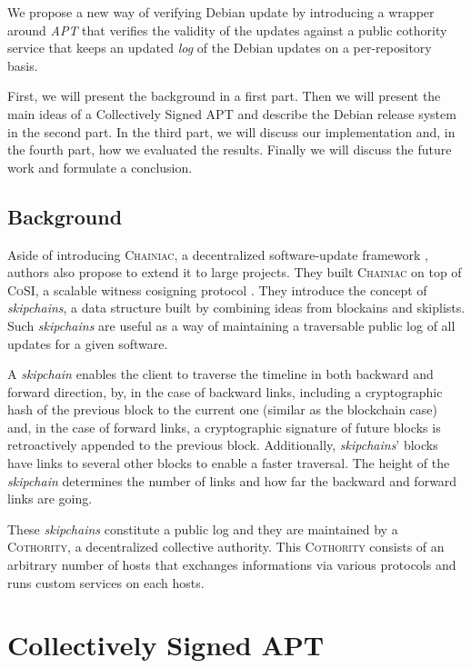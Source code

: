 \documentclass[11pt, upma4paper, twoside, openany, parskip=half]{book}
\begin{document}
We propose a new way of verifying Debian update by introducing a wrapper around \emph{APT} that verifies the validity of the updates against a public cothority service that keeps an updated \emph{log} of the Debian updates on a per-repository basis.

First, we will present the background in a first part. Then we will present the main ideas of a Collectively Signed APT and describe the Debian release system in the second part. In the third part, we will discuss our implementation and, in the fourth part, how we evaluated the results. Finally we will discuss the future work and formulate a conclusion.

\section{Background}
Aside of introducing \textsc{Chainiac}, a decentralized software-update framework \cite{_back_2016}, authors also propose to extend it to large projects. They built \textsc{Chainiac} on top of \textsc{CoSI}, a scalable witness cosigning protocol \cite{syta_keeping_2015}. They introduce the concept of \emph{skipchains}, a data structure built by combining ideas from blockains and skiplists. Such \emph{skipchains} are useful as a way of maintaining a traversable public log of all updates for a given software. 

A \emph{skipchain} enables the client to traverse the timeline in both backward and forward direction, by, in the case of backward links, including a cryptographic hash of the previous block to the current one (similar as the blockchain case) and, in the case of forward links, a cryptographic signature of future blocks is retroactively appended to the previous block. Additionally, \emph{skipchains}' blocks have links to several other blocks to enable a faster traversal. The height of the \emph{skipchain} determines the number of links and how far the backward and forward links are going.

These \emph{skipchains} constitute a public log and they are maintained by a \textsc{Cothority}, a decentralized collective authority. This \textsc{Cothority} consists of an arbitrary number of hosts that exchanges informations via various protocols and runs custom services on each hosts.

\chapter{Collectively Signed APT}
\end{document}
